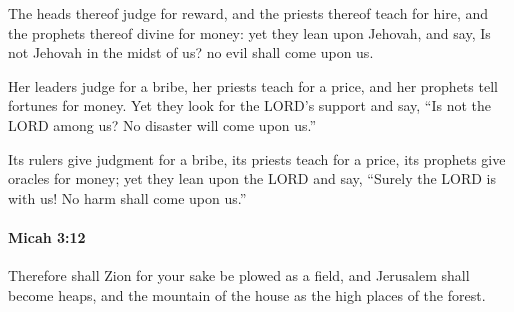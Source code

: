			\begin{versebox}
					\item[BHS] 
					\item[LXX] 
					\item[ASV] The heads thereof judge for reward, and the priests thereof teach for hire, and the prophets thereof divine for money: yet they lean upon Jehovah, and say, Is not Jehovah in the midst of us? no evil shall come upon us.
					\item[NIV] Her leaders judge for a bribe, her priests teach for a price, and her prophets tell fortunes for money. Yet they look for the LORD’s support and say, “Is not the LORD among us? No disaster will come upon us.”
					\item[NRSV] Its rulers give judgment for a bribe, its priests teach for a price, its prophets give oracles for money; yet they lean upon the LORD and say, “Surely the LORD is with us! No harm shall come upon us.”
			\end{versebox}

		\paragraph{Micah 3:12} %
			\label{MICAH-3-12}

			Therefore shall Zion for your sake be plowed as a field, and Jerusalem shall become heaps, and the mountain of the house as the high places of the forest.

